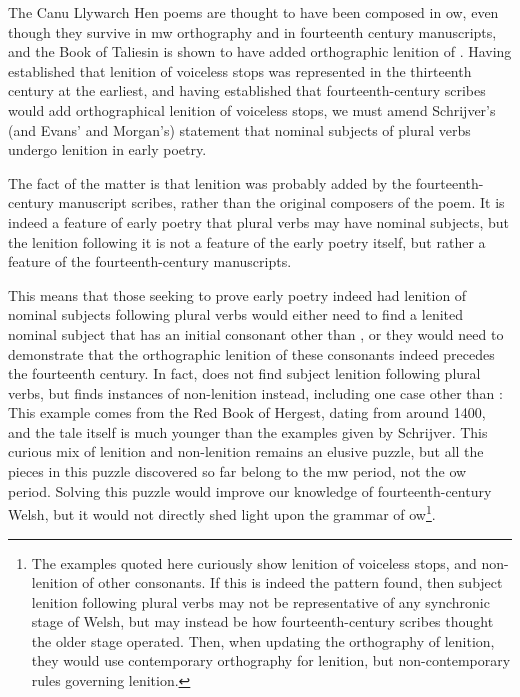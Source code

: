 The Canu Llywarch Hen poems are thought to have been composed in \gls{ow}, even though they survive in \gls{mw} orthography and in fourteenth century manuscripts, and the Book of Taliesin is shown to have added orthographic lenition of . Having established that  lenition of voiceless stops was represented in the thirteenth century at the earliest, and having established that fourteenth-century scribes would add orthographical lenition of voiceless stops, we must amend Schrijver's (and Evans' and Morgan's) statement that nominal subjects of plural verbs undergo lenition in early poetry.

The fact of the matter is that lenition was probably added by the fourteenth-century manuscript scribes, rather than the original composers of the poem. It is indeed a feature of early poetry that plural verbs may have nominal subjects, but the lenition following it is not a feature of the early poetry itself, but rather a feature of the fourteenth-century manuscripts.

This means that those seeking to prove early poetry indeed had lenition of nominal subjects following plural verbs would either need to find a lenited nominal subject that has an initial consonant other than , or they would need to demonstrate that the orthographic lenition of these consonants indeed precedes the fourteenth century. In fact, \textcite[65--66]{van_development14} does not find subject lenition following plural verbs, but finds instances of non-lenition instead, including one case other than :
This example comes from the Red Book of Hergest, dating from around 1400, and the tale itself is much younger than the examples given by Schrijver. This curious mix of lenition and non-lenition remains an elusive puzzle, but all the pieces in this puzzle discovered so far belong to the \gls{mw} period, not the \gls{ow} period. Solving this puzzle would improve our knowledge of fourteenth-century Welsh, but it would not directly shed light upon the grammar of \gls{ow}\footnote{The examples quoted here curiously show lenition of voiceless stops, and non-lenition of other consonants. If this is indeed the pattern found, then subject lenition following plural verbs may not be representative of any synchronic stage of Welsh, but may instead be how fourteenth-century scribes thought the older stage operated. Then, when updating the orthography of lenition, they would use contemporary orthography for lenition, but non-contemporary rules governing lenition.}.

